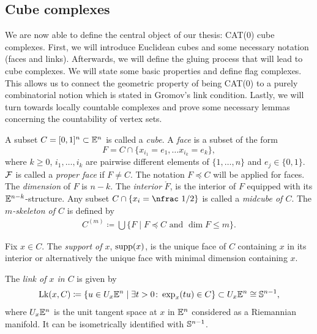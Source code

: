 \subsection{Cube complexes}
\label{sec:complex}

We are now able to define the central object of our thesis: CAT(0) cube complexes. First, we will introduce Euclidean cubes and some necessary notation (faces and links). Afterwards, we will define the gluing process that will lead to cube complexes. We will state some basic properties and define flag complexes. This allows us to connect the geometric property of being CAT(0) to a purely combinatorial notion which is stated in Gromov's link condition. Lastly, we will turn towards locally countable complexes and prove some necessary lemmas concerning the countability of vertex sets.

\begin{defin}[Cubes]
  A subset \(C = [0,1]^n \subset \mathbb{E}^n\) is called a \emph{cube}. A \emph{face} is a subset of the form 
  \[
    F = C \cap \{x_{i_1} = e_1, \dots x_{i_k} = e_k\},
  \]
  where \(k\geq0\), \(i_1, \dots, i_k\) are pairwise different elements of \(\{1, \dots, n\}\) and \(e_j \in \{0, 1\}\). \(\mathcal{F}\) is called a \emph{proper face} if \(F \neq C\). The notation \(F \preceq C\) will be applied for faces. The \emph{dimension} of \(F\) is \(n - k\). The \emph{interior} \(\mathring F\), is the interior of \(F\) equipped with its \(\mathbb{E}^{n-k}\)-structure. Any subset \(C \cap \{x_i = \text{\nfrac 1/2}\}\) is called a \emph{midcube of \(C\)}. The \emph{\(m\)-skeleton of \(C\)} is defined by
  \begin{align*}
    C^{(m)} \coloneqq \bigcup \{F \mid F \preceq C \text{ and } \dim F \leq m\}.
  \end{align*}

  Fix \(x \in C\). The \emph{support of \(x\)}, \(\operatorname{supp}(x)\), is the unique face of \(C\) containing \(x\) in its interior or alternatively the unique face with minimal dimension containing \(x\).

  The \emph{link of \(x\) in \(C\)} is given by
  \begin{align*}
    \operatorname{Lk}(x,C) \coloneqq \{u \in U_x\mathbb{E}^n \mid \exists t > 0 \colon \exp_x(tu) \in C\} \subset U_x\mathbb{E}^n \cong \mathbb{S}^{n-1},
  \end{align*}
  where \(U_x\mathbb{E}^n\) is the unit tangent space at \(x\) in \(\mathbb{E}^n\) considered as a Riemannian manifold. It can be isometrically identified with \(\mathbb{S}^{n-1}\).
\end{defin}

